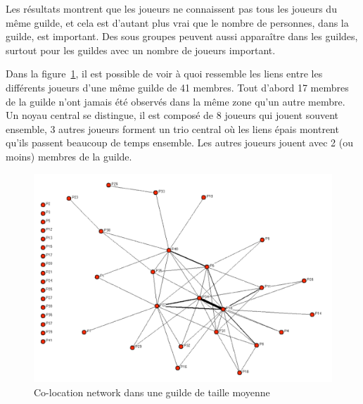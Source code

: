 \par Les résultats montrent que les joueurs ne connaissent pas tous les joueurs du même guilde, et cela est d'autant plus vrai que le nombre de personnes, dans la guilde, est important. Des sous groupes peuvent aussi apparaître dans les guildes, surtout pour les guildes avec un nombre de joueurs important. 
\par Dans la figure~\ref{co-location}, il est possible de voir à quoi ressemble les liens entre les différents joueurs d'une même guilde de 41 membres. Tout d'abord 17 membres de la guilde n'ont jamais été observés dans la même zone qu'un autre membre. Un noyau central se distingue, il est composé de 8 joueurs qui jouent souvent ensemble, 3 autres joueurs forment un trio central où les liens épais montrent qu'ils passent beaucoup de temps ensemble. Les autres joueurs jouent avec 2 (ou moins) membres de la guilde.
	 \begin{figure}[!h]
        \centering
        \includegraphics[scale=0.95]{./Ressources/Images/co-location.png}
        \caption{Co-location network dans une guilde de taille moyenne}
        \label{co-location}
        \end{figure}

